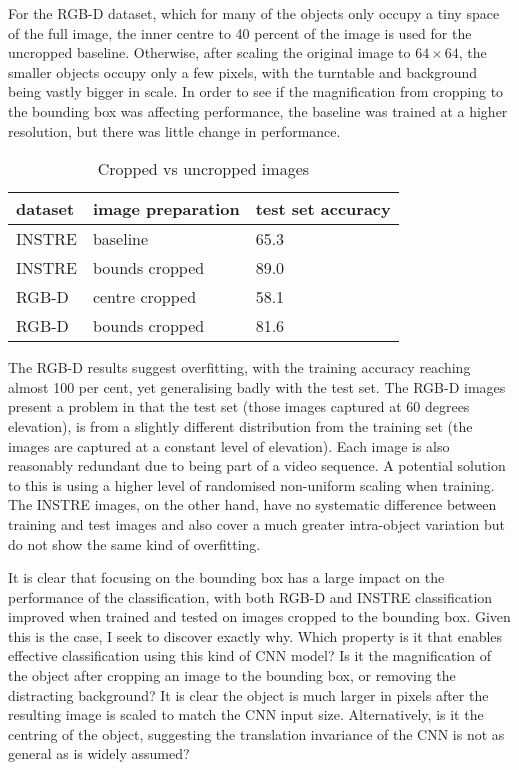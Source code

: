 For the RGB-D dataset, which for many of the objects only occupy a tiny space of the full image, the inner centre to 40 percent of the image is used for the uncropped baseline. Otherwise, after scaling the original image to $ 64 \times 64$, the smaller objects occupy only a few pixels, with the turntable and background being vastly bigger in scale. In order to see if the magnification from cropping to the bounding box was affecting performance,  the baseline was trained at a higher resolution, but there was little change in performance.


\begin{table}[h]
  \centering
    \caption{Cropped vs uncropped images }
    
  \begin{tabular}{ l l l }
    
    dataset & image preparation & test set accuracy \\
    \toprule
    
    INSTRE & baseline &  65.3 \\
    INSTRE & bounds cropped & 89.0 \\
    
    RGB-D & centre cropped & 58.1 \\
    RGB-D & bounds cropped & 81.6 \\
    
    \bottomrule
  \end{tabular}
\label{fig:focus_crop}
\end{table}

The RGB-D results suggest overfitting, with the training accuracy reaching almost 100 per cent, yet generalising badly with the test set. The RGB-D images present a problem in that the test set (those images captured at 60 degrees elevation), is from a slightly different distribution from the training set (the images are captured at a constant level of elevation). Each image is also reasonably redundant due to being part of a video sequence. A potential solution to this is using a higher level of randomised non-uniform scaling when training. The INSTRE images, on the other hand, have no systematic difference between training and test images and also cover a much greater intra-object variation but do not show the same kind of overfitting.

It is clear that focusing on the bounding box has a large impact on the performance of the classification, with both RGB-D and INSTRE classification improved when trained and tested on images cropped to the bounding box. Given this is the case, I seek to discover exactly why. Which property is it that enables effective classification using this kind of CNN model? Is it the magnification of the object after cropping an image to the bounding box, or removing the distracting background? It is clear the object is much larger in pixels after the resulting image is scaled to match the CNN input size. Alternatively, is it the centring of the object, suggesting the translation invariance of the CNN is not as general as is widely assumed?



